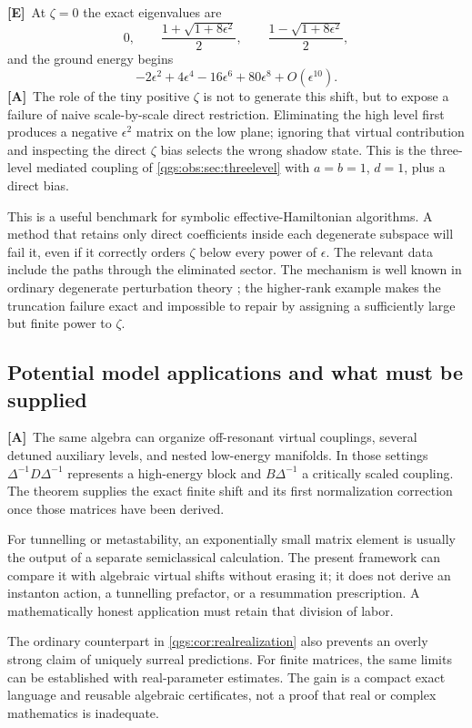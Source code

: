 \documentclass[11pt,oneside]{article}
\numberwithin{equation}{section}
\theoremstyle{plain}
\theoremstyle{definition}
\theoremstyle{remark}
\newcommand{\TE}{\textcolor{TierE}{\textsf{\bfseries[E]}}}
\newcommand{\TA}{\textcolor{TierA}{\textsf{\bfseries[A]}}}
\begin{document}
\TE\ At $\zeta=0$ the exact eigenvalues are
\[
 0,\qquad \frac{1+\sqrt{1+8\epsilon^2}}2,\qquad
 \frac{1-\sqrt{1+8\epsilon^2}}2,
\]
and the ground energy begins
\[
 -2\epsilon^2+4\epsilon^4-16\epsilon^6+80\epsilon^8+O(\epsilon^{10}).
\]
\TA\ The role of the tiny positive $\zeta$ is not to generate this shift, but to expose a failure of naive scale-by-scale direct restriction. Eliminating the high level first produces a negative $\epsilon^2$ matrix on the low plane; ignoring that virtual contribution and inspecting the direct $\zeta$ bias selects the wrong shadow state. This is the three-level mediated coupling of \cref{qgs:obs:sec:threelevel} with $a=b=1$, $d=1$, plus a direct bias.

This is a useful benchmark for symbolic effective-Hamiltonian algorithms. A method that retains only direct coefficients inside each degenerate subspace will fail it, even if it correctly orders $\zeta$ below every power of $\epsilon$. The relevant data include the paths through the eliminated sector. The mechanism is well known in ordinary degenerate perturbation theory \cite{BDL}; the higher-rank example makes the truncation failure exact and impossible to repair by assigning a sufficiently large but finite power to $\zeta$.

\subsection{Potential model applications and what must be supplied}
\TA\ The same algebra can organize off-resonant virtual couplings, several detuned auxiliary levels, and nested low-energy manifolds. In those settings $\Delta^{-1}D\Delta^{-1}$ represents a high-energy block and $B\Delta^{-1}$ a critically scaled coupling. The theorem supplies the exact finite shift and its first normalization correction once those matrices have been derived.

For tunnelling or metastability, an exponentially small matrix element is usually the output of a separate semiclassical calculation. The present framework can compare it with algebraic virtual shifts without erasing it; it does not derive an instanton action, a tunnelling prefactor, or a resummation prescription. A mathematically honest application must retain that division of labor.

The ordinary counterpart in \cref{qgs:cor:realrealization} also prevents an overly strong claim of uniquely surreal predictions. For finite matrices, the same limits can be established with real-parameter estimates. The gain is a compact exact language and reusable algebraic certificates, not a proof that real or complex mathematics is inadequate.
\end{document}
